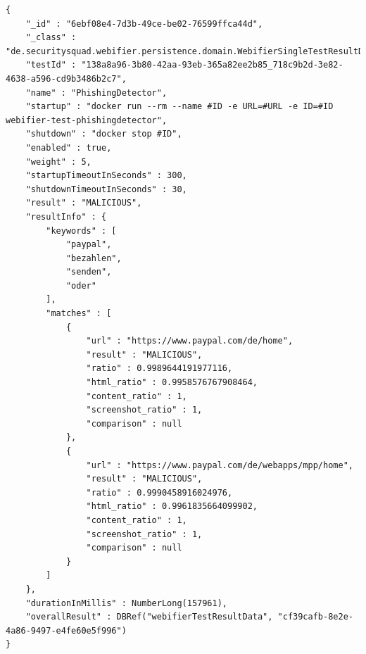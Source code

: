 \newpage

\begin{scriptsize}
\begin{lstlisting}
{
    "_id" : "6ebf08e4-7d3b-49ce-be02-76599ffca44d",
    "_class" : "de.securitysquad.webifier.persistence.domain.WebifierSingleTestResultData",
    "testId" : "138a8a96-3b80-42aa-93eb-365a82ee2b85_718c9b2d-3e82-4638-a596-cd9b3486b2c7",
    "name" : "PhishingDetector",
    "startup" : "docker run --rm --name #ID -e URL=#URL -e ID=#ID webifier-test-phishingdetector",
    "shutdown" : "docker stop #ID",
    "enabled" : true,
    "weight" : 5,
    "startupTimeoutInSeconds" : 300,
    "shutdownTimeoutInSeconds" : 30,
    "result" : "MALICIOUS",
    "resultInfo" : {
        "keywords" : [
            "paypal",
            "bezahlen",
            "senden",
            "oder"
        ],
        "matches" : [
            {
                "url" : "https://www.paypal.com/de/home",
                "result" : "MALICIOUS",
                "ratio" : 0.9989644191977116,
                "html_ratio" : 0.9958576767908464,
                "content_ratio" : 1,
                "screenshot_ratio" : 1,
                "comparison" : null
            },
            {
                "url" : "https://www.paypal.com/de/webapps/mpp/home",
                "result" : "MALICIOUS",
                "ratio" : 0.9990458916024976,
                "html_ratio" : 0.9961835664099902,
                "content_ratio" : 1,
                "screenshot_ratio" : 1,
                "comparison" : null
            }
        ]
    },
    "durationInMillis" : NumberLong(157961),
    "overallResult" : DBRef("webifierTestResultData", "cf39cafb-8e2e-4a86-9497-e4fe60e5f996")
}

\end{lstlisting}
\end{scriptsize}
